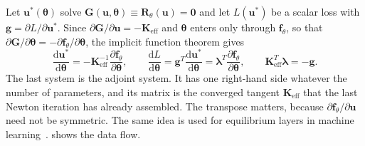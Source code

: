 Let $\bm u^\ast(\bm\theta)$ solve $\bm G(\bm u,\bm\theta)\equiv\bm R_\theta(\bm u)=\bm 0$ and let $L(\bm u^\ast)$ be a scalar loss with $\bm g=\partial L/\partial\bm u^\ast$. Since $\partial\bm G/\partial\bm u=-\bm K_{\mathrm{eff}}$ and $\bm\theta$ enters only through $\bm f_\theta$, so that $\partial\bm G/\partial\bm\theta=-\partial\bm f_\theta/\partial\bm\theta$, the implicit function theorem gives
\begin{equation}\label{eq:df-impl}
\frac{\mathrm d\bm u^\ast}{\mathrm d\bm\theta}=-\bm K_{\mathrm{eff}}^{-1}\frac{\partial\bm f_\theta}{\partial\bm\theta},\qquad
\frac{\mathrm dL}{\mathrm d\bm\theta}=\bm g^T\frac{\mathrm d\bm u^\ast}{\mathrm d\bm\theta}=\bm\lambda^T\frac{\partial\bm f_\theta}{\partial\bm\theta},\qquad \bm K_{\mathrm{eff}}^T\bm\lambda=-\bm g .
\end{equation}
The last system is the adjoint system. It has one right-hand side whatever the number of parameters, and its matrix is the converged tangent $\bm K_{\mathrm{eff}}$ that the last Newton iteration has already assembled. The transpose matters, because $\partial\bm f_\theta/\partial\bm u$ need not be symmetric. The same idea is used for equilibrium layers in machine learning~\cite{bai2019deq}.  shows the data flow.


